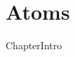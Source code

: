 \documentclass[main.tex]{subfiles}
\newcommand\chapterlabel{Ch-Table}\setcounter{figurenewcounter}{0}\setcounter{tablenewcounter}{0}\setcounter{formulanewcounter}{0}\chapterpicture{../{\chapterlabel}/figure1}\chapterpicturelabel{PxFuel}
\begin{document}
 \setcounter{chapter}{2}\chapter[Atoms]{Atoms} %

 
 
   
 {ChapterIntro}
\end{document}
